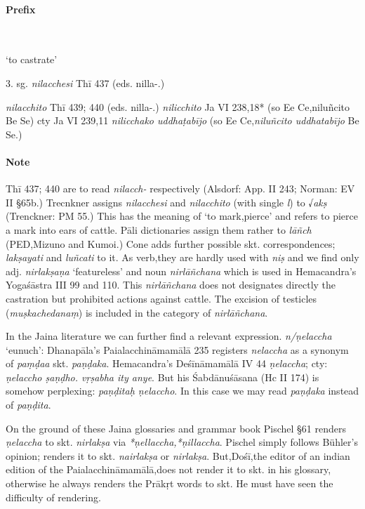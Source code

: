 \documentclass[11pt]{article}
\newcommand*\ṛ{r\symbol{"325}}
\newcommand*\Ṛ{R\symbol{"325}}
\newcommand*\ṝ{r\symbol{"304}\symbol{"325}}
\newcommand*\Ṝ{R\symbol{"304}\symbol{"325}}
\newcommand*\ḷ{l\symbol{"325}}
\newcommand*\ḹ{l\symbol{"304}\symbol{"325}}
\newcommand*\Ḷ{L\symbol{"325}}
\newcommand*\Ḹ{L\symbol{"304}\symbol{"325}}
\begin{document}
\paragraph*{Prefix}\mbox{}\\
\begin{description}[leftmargin=\parindent]
\item[nir-]`to castrate'
\item[pret.] 3. sg. \textit{nilacchesi} Thī 437 (eds. nilla-.)
\item[ppp.] \textit{nilacchito} Thī 439; 440 (eds. nilla-.)
\textit{nilicchito} Ja VI 238,18* (so Ee Ce,niluñcito Be Se) cty Ja VI 239,11 \textit{nilicchako uddhaṭabījo} (so Ee Ce,\textit{niluñcito uddhatabījo} Be Se.)
\end{description}

\paragraph*{Note} Thī 437; 440 are to read \textit{nilacch-} respectively (Alsdorf: App. II 243; Norman: EV II §65b.)
Trecnkner assigns \textit{nilacchesi} and \textit{nilacchito} (with single \textit{l}) to √\textit{akṣ}
(Trenckner: PM 55.)
This has the meaning of `to mark,pierce' and refers to pierce a mark into ears of cattle.
Pāli dictionaries assign them rather to \textit{lāñch} (PED,Mizuno and Kumoi.)
Cone adds further possible skt. correspondences; \textit{lakṣayati} and \textit{luñcati} to it.
As verb,they are hardly used with \textit{niṣ} and we find only adj. \textit{nirlakṣaṇa} `featureless' and noun \textit{nirlāñchana}
which is used in Hemacandra's Yogaśāstra III 99 and 110.
This \textit{nirlāñchana} does not designates directly the castration but prohibited actions against cattle.
The excision of testicles (\textit{muṣkachedanaṃ}) is included in the category of \textit{nirlāñchana}.

In the Jaina literature we can further find a relevant expression.
\textit{n/ṇelaccha} `eunuch':
Dhanapāla's Paialacchināmamālā 235 registers \textit{nelaccha} as a synonym of \textit{paṃḍaa} skt. \textit{paṇḍaka}.
Hemacandra's Deśīnāmamālā IV 44 \textit{ṇelaccha}; cty: \textit{ṇelaccho ṣaṇḍho. vṛṣabha ity anye}.
But his Śabdānuśāsana (Hc II 174) is somehow perplexing: \textit{paṇḍitaḥ ṇelaccho}.
In this case we may read \textit{paṇḍaka} instead of \textit{paṇḍita}.

On the ground of these Jaina glossaries and grammar book
Pischel §61 renders \textit{ṇelaccha} to skt. \textit{nirlakṣa} via \textit{*ṇellaccha,*ṇillaccha}.
Pischel simply follows Bühler's opinion; \citet[144]{Buhler:1878} renders it to skt. \textit{nairlakṣa} or \textit{nirlakṣa}.
But,Dośī,the editor of an indian edition of the Paialacchināmamālā,does not render it to skt. in his glossary,
otherwise he always renders the Prākṛt words to skt. He must have seen the difficulty of rendering.
\end{document}
